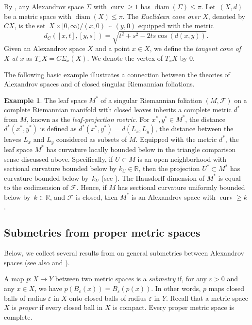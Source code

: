 \documentclass[pdftex]{sigma}
\numberwithin{equation}{section}
\theoremstyle{definition}
\newtheorem{Example}[thm]{Example}
\DeclareMathOperator{\curv}{curv}
\DeclareMathOperator{\diam}{diam}
\newcommand{\R}{\mathbb{R}} %
\newcommand{\fol}{\mathcal{F}}
\begin{document}
By \cite[Theorem~10.4.1]{BuragoBuragoIvanov}, any Alexandrov space $\Sigma$ with $\curv \geq 1$ has $\diam(\Sigma)\leq \pi$. Let~$(X,d)$ be a metric space with $\diam(X)\leq \pi$. The \emph{Euclidean cone over $X$}, denoted by $CX$, is the set~${X\times [0,\infty)/(x,0)\sim (y,0)}$ equipped with the metric
\[
	d_C([x,t],[y,s]) = \sqrt{t^2+s^2-2ts\cos(d(x,y))}.
\]
Given an Alexandrov space $X$ and a point $x\in X$, we define the \emph{tangent cone of $X$ at $x$} as $T_x X = C\Sigma_x(X)$. We denote the vertex of $T_xX$ by $0$.

The following basic example illustrates a connection between the theories of Alexandrov spaces and of closed singular Riemannian foliations.

\begin{Example}	
\label{ex:quotient.of.srf.is.alex.space}
The leaf space $M^\ast$ of a singular Riemannian foliation $(M,\fol)$ on a complete Riemannian manifold with closed leaves inherits a complete metric $d^\ast$ from $M$, known as the \emph{leaf-projection metric}.
For $x^\ast,y^\ast\in M^\ast$, the distance $d^\ast(x^\ast,y^\ast)$ is defined as
$
	 d^\ast(x^\ast,y^\ast) = d(L_x,L_y)$,
the distance between the leaves $L_x$ and $L_y$ considered as subsets of $M$.
Equipped with the metric $d^\ast$, the leaf space $M^\ast$ has curvature locally bounded below in the triangle comparison sense discussed above. Specifically, if $U\subset M$ is an open neighborhood with sectional curvature bounded below by $k_U\in \R$, then the projection $U^\ast \subset M^\ast$ has curvature bounded below by~$k_U$ (see \cite{LytchakThorbergsson2010}). The Hausdorff dimension of $M^*$ is equal to the codimension of $\fol$. Hence, if $M$ has sectional curvature uniformly bounded below by~$k\in \R$, and $\fol$ is closed, then $M^*$ is an Alexandrov space with $\curv \geq k$.
\end{Example}	


		
\subsection{Submetries from proper metric spaces}
\label{S: Submetries between proper metric spaces}	
Below, we collect several results from \cite{Lytchak} on general submetries between Alexandrov spaces (see also \cite{GuijarroWalschap2011} and \cite{KapovitchLytchak2022}).

A map $p\colon X \to Y$ between two metric spaces is a \emph{submetry} if, for any $\varepsilon>0$ and any $x\in X$, we have $p(B_\varepsilon(x)) =B_\varepsilon(p(x))$. In other words, $p$ maps closed balls of radius $\varepsilon$ in $X$ onto closed balls of radius $\varepsilon$ in $Y$. Recall that a metric space $X$ is \emph{proper} if every closed ball in $X$ is compact. Every proper metric space is complete.
\end{document}
